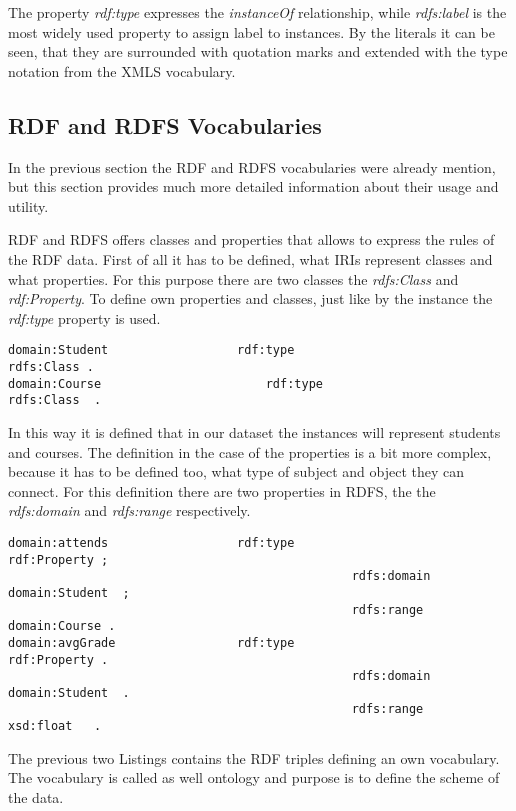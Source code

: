 The property \textit{rdf:type} expresses the \textit{instanceOf} relationship, while \textit{rdfs:label} is the most widely used property to assign label to instances. By the literals it can be seen, that they are surrounded with quotation marks and extended with the type notation from the XMLS vocabulary.


\subsection{RDF and RDFS Vocabularies}


In the previous section the RDF and RDFS vocabularies were already mention, but this section provides much more detailed information about their usage and utility. 


RDF and RDFS offers classes and properties that allows to express the rules of the RDF data. First of all it has to be defined, what IRIs represent classes and what properties. For this purpose there are two classes the \textit{rdfs:Class} and \textit{rdf:Property}. To define own properties and classes, just like by the instance the \textit{rdf:type} property is used.

\begin{lstlisting}[basicstyle=\footnotesize, captionpos=b, caption=Class and property definition, label=lst:sparql,
frame=single]
domain:Student					rdf:type						rdfs:Class .
domain:Course						rdf:type						rdfs:Class	.
\end{lstlisting}

In this way it is defined that in our dataset the instances will represent students and courses. The definition in the case of the properties is a bit more complex, because it has to be defined too, what type of subject and object they can connect. For this definition there are two properties in RDFS, the  the \textit{rdfs:domain} and \textit{rdfs:range} respectively.

\begin{lstlisting}[basicstyle=\footnotesize, captionpos=b, caption=Property definition I., label=lst:sparql,
frame=single]
domain:attends					rdf:type						rdf:Property ;
												rdfs:domain					domain:Student	;
												rdfs:range					domain:Course .
domain:avgGrade					rdf:type						rdf:Property .
												rdfs:domain					domain:Student	.
												rdfs:range					xsd:float	.
\end{lstlisting}

The previous two Listings contains the RDF triples defining an own vocabulary. The vocabulary is called as well ontology and purpose is to define the scheme of the data. 


